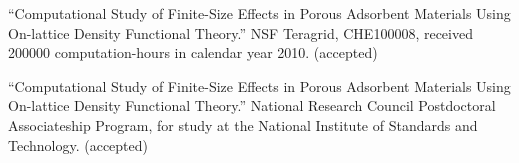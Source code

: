 ``Computational Study of Finite-Size Effects in Porous Adsorbent Materials Using On-lattice Density Functional Theory.'' NSF Teragrid, CHE100008, received 200000 computation-hours in calendar year 2010. (accepted)

``Computational Study of Finite-Size Effects in Porous Adsorbent Materials Using On-lattice Density Functional Theory.'' National Research Council Postdoctoral Associateship Program, for study at the National Institute of Standards and Technology. (accepted)
